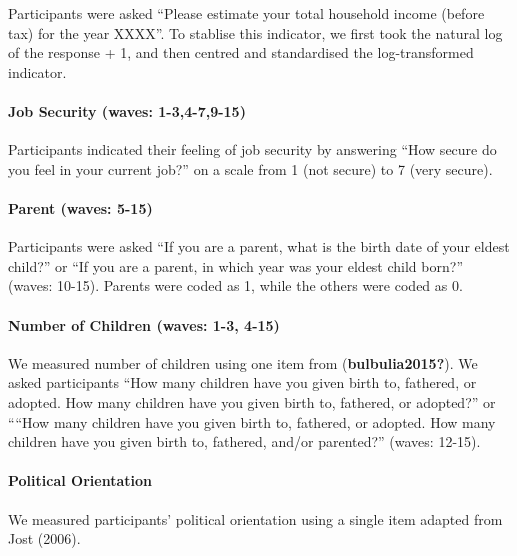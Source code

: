 \documentclass[
  letterpaper,
  DIV=11,
  numbers=noendperiod]{scrartcl}
\let\oldparagraph\paragraph
\renewcommand{\paragraph}[1]{\oldparagraph{#1}\mbox{}}
\begin{document}
Participants were asked ``Please estimate your total household income
(before tax) for the year XXXX''. To stablise this indicator, we first
took the natural log of the response + 1, and then centred and
standardised the log-transformed indicator.

\hypertarget{job-security-waves-1-34-79-15}{%
\paragraph{Job Security (waves:
1-3,4-7,9-15)}\label{job-security-waves-1-34-79-15}}

Participants indicated their feeling of job security by answering ``How
secure do you feel in your current job?'' on a scale from 1 (not secure)
to 7 (very secure).

\hypertarget{parent-waves-5-15}{%
\paragraph{Parent (waves: 5-15)}\label{parent-waves-5-15}}

Participants were asked ``If you are a parent, what is the birth date of
your eldest child?'' or ``If you are a parent, in which year was your
eldest child born?'' (waves: 10-15). Parents were coded as 1, while the
others were coded as 0.

\hypertarget{number-of-children-waves-1-3-4-15}{%
\paragraph{Number of Children (waves: 1-3,
4-15)}\label{number-of-children-waves-1-3-4-15}}

We measured number of children using one item from
(\textbf{bulbulia2015?}). We asked participants ``How many children have
you given birth to, fathered, or adopted. How many children have you
given birth to, fathered, or adopted?'' or ````How many children have
you given birth to, fathered, or adopted. How many children have you
given birth to, fathered, and/or parented?'' (waves: 12-15).

\hypertarget{political-orientation}{%
\paragraph{Political Orientation}\label{political-orientation}}

We measured participants' political orientation using a single item
adapted from Jost (2006).
\end{document}
